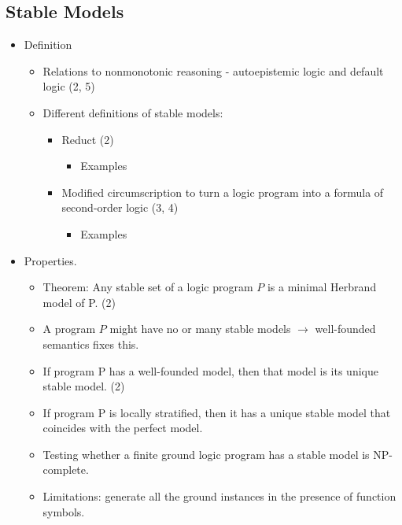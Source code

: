 \subsection{Stable Models}
\begin{itemize}
    \item Definition
        \begin{itemize}
            \item Relations to nonmonotonic reasoning - autoepistemic logic and default logic (2, 5)
            \item Different definitions of stable models:
            \begin{itemize}
                \item Reduct (2)
                    \begin{itemize}
                        \item Examples
                    \end{itemize}
                \item Modified circumscription to turn a logic program into a formula of second-order logic (3, 4)
                \begin{itemize}
                    \item Examples
                \end{itemize}
            \end{itemize}
        \end{itemize}
    \item Properties.
        \begin{itemize}
            \item Theorem: Any stable set of a logic program $P$ is a minimal Herbrand model of P. (2)
            \item A program $P$ might have no or many stable models $\longrightarrow$ well-founded semantics fixes this.
            \item If program P has a well-founded model, then that model is its unique stable model. (2)
            \item If program P is locally stratified, then it has a unique stable model that coincides with 
            the perfect model.
            \item Testing whether a finite ground logic program has a stable model is NP-complete.
            \item Limitations: generate all the ground instances in the presence of function symbols.
        \end{itemize}
\end{itemize}

